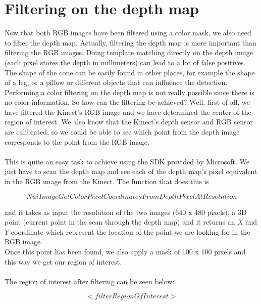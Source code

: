 \section{Filtering on the depth map}
\noindent
Now that both RGB images have been filtered using a color mask, we also need to filter the depth map. Actually, filtering the depth map is more important than filtering the RGB images. Doing template matching directly on the depth image (each pixel stores the depth in millimeters) can lead to a lot of false positives. The shape of the cone can be easily found in other places, for example the shape of a leg, or a pillow or different objects that can influence the detection. 
\\
Performing a color filtering on the depth map is not really possible since there is no color information. So how can the filtering be achieved? Well, first of all, we have filtered the Kinect's RGB image and we have determined the center of the region of interest. We also know that the Kinect's depth sensor and RGB sensor are calibrated, so we could be able to see which point from the depth image corresponds to the point from the RGB image. 
\\\\
This is quite an easy task to achieve using the SDK provided by Microsoft. We just have to scan the depth map and see each of the depth map's pixel equivalent in the RGB image from the Kinect. The function that does this is 

$$ NuiImageGetColorPixelCoordinatesFromDepthPixelAtResolution $$

\noindent
and it takes as input the resolution of the two images (640 x 480 pixels), a 3D point (current point in the scan through the depth map) and it returns an $X$ and $Y$ coordinate which represent the location of the point we are looking for in the RGB image. 
\\
Once this point has been found, we also apply a mask of 100 x 100 pixels and this way we get our region of interest. 
\\\\
The region of interest after filtering can be seen below:

$$ <filterRegionOfInterest> $$

